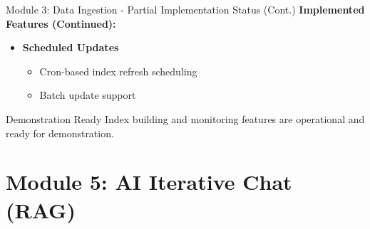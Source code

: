 \documentclass[aspectratio=169,xcolor=dvipsnames]{beamer}
\begin{document}
\begin{frame}{Module 3: Data Ingestion - Partial Implementation Status (Cont.)}
    \large
    \textbf{Implemented Features (Continued):}
    \begin{itemize}
        \item \checkmark \textbf{Scheduled Updates}
        \begin{itemize}
            \normalsize
            \item Cron-based index refresh scheduling
            \item Batch update support
        \end{itemize}
    \end{itemize}
    
    \vspace{1em}
    \begin{block}{Demonstration Ready}
        Index building and monitoring features are operational and ready for demonstration.
    \end{block}
\end{frame}

\section{Module 5: AI Iterative Chat (RAG)}
\end{document}
